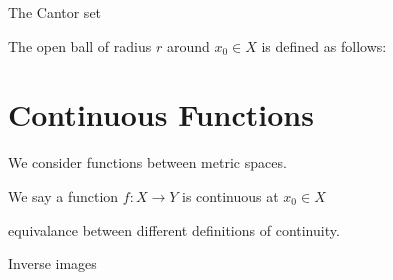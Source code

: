 The Cantor set

\begin{definition}
    The open ball of radius $r$ around $x_0\in X$ is defined as follows:
\end{definition}


\section{Continuous Functions}
We consider functions between metric spaces.

\begin{definition}[Continuity]
    We say a function $f:X\rightarrow Y$ is continuous at $x_0\in X$
\end{definition}

equivalance between different definitions of continuity.

Inverse images


